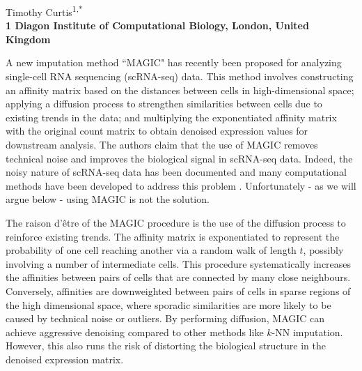 \documentclass[10pt,letterpaper]{article}
\begin{document}
\vspace*{0.35in}

\begin{flushleft}
{\Large
    \textbf{}
}
\newline

Timothy Curtis\textsuperscript{1,*}
\\
\bigskip
\bf{1} Diagon Institute of Computational Biology, London, United Kingdom \\
\bigskip

\end{flushleft}

A new imputation method ``MAGIC" \cite{vandijk2018recovering} has recently been proposed for analyzing single-cell RNA sequencing (scRNA-seq) data.
This method involves constructing an affinity matrix based on the distances between cells in high-dimensional space;
applying a diffusion process to strengthen similarities between cells due to existing trends in the data;
and multiplying the exponentiated affinity matrix with the original count matrix to obtain denoised expression values for downstream analysis.
The authors claim that the use of MAGIC removes technical noise and improves the biological signal in scRNA-seq data.
Indeed, the noisy nature of scRNA-seq data has been documented \cite{grun2015design} and many computational methods have been developed to address this problem \cite{bacher2016design}.
Unfortunately - as we will argue below - using MAGIC is not the solution.

The raison d'\^etre of the MAGIC procedure is the use of the diffusion process to reinforce existing trends.
The affinity matrix is exponentiated to represent the probability of one cell reaching another via a random walk of length $t$, possibly involving a number of intermediate cells.
This procedure systematically increases the affinities between pairs of cells that are connected by many close neighbours.
Conversely, affinities are downweighted between pairs of cells in sparse regions of the high dimensional space, 
where sporadic similarities are more likely to be caused by technical noise or outliers.
By performing diffusion, MAGIC can achieve aggressive denoising compared to other methods like $k$-NN imputation.
However, this also runs the risk of distorting the biological structure in the denoised expression matrix.
\end{document}

